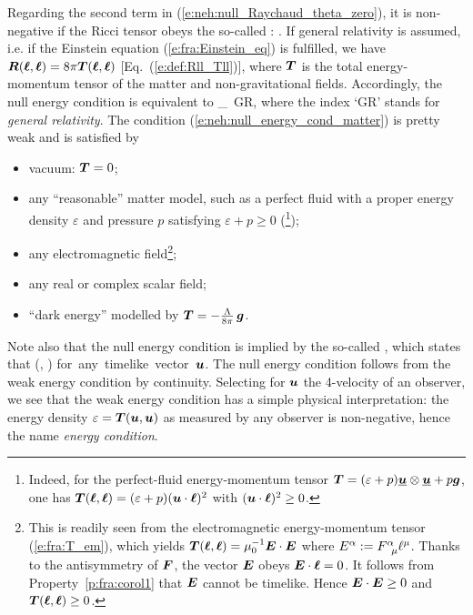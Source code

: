 Regarding the second term in (\ref{e:neh:null_Raychaud_theta_zero}),
it is non-negative if the Ricci tensor obeys the so-called
:
\be \label{e:neh:null_energy_cond}
    .
\ee
If general relativity is assumed, i.e. if the Einstein equation
(\ref{e:fra:Einstein_eq}) is fulfilled, we have
$\bm{R}(\bm{\ell}, \bm{\ell}) = 8\pi \bm{T}(\bm{\ell},\bm{\ell})$ [Eq.~(\ref{e:def:Rll_Tll})],
where $\bm{T}$ is the total energy-momentum tensor of the matter and
non-gravitational fields. Accordingly, the null energy condition
is equivalent to
\be \label{e:neh:null_energy_cond_matter}
    _{\rm\,  GR},
\ee
where the index `GR' stands for \emph{general relativity}.
The condition (\ref{e:neh:null_energy_cond_matter}) is pretty weak and is satisfied by
\begin{itemize}
\item vacuum: $\bm{T}=0$;
\item any ``reasonable'' matter model, such as a perfect fluid with a
proper energy density $\varepsilon$ and pressure $p$ satisfying
$\varepsilon+p\geq 0$ (\footnote{Indeed, for the perfect-fluid
energy-momentum tensor $\bm{T} = (\varepsilon+p)\underline{\bm{u}}\otimes\underline{\bm{u}} + p \bm{g}$,
one has
$\bm{T}(\bm{\ell},\bm{\ell}) = (\varepsilon+p)(\bm{u}\cdot\bm{\ell})^2$ with $(\bm{u}\cdot\bm{\ell})^2\geq 0$.});
\item any electromagnetic field\footnote{This is readily seen from the electromagnetic
energy-momentum tensor (\ref{e:fra:T_em}), which yields $\bm{T}(\bm{\ell},\bm{\ell}) = \mu_0^{-1} \bm{E}\cdot\bm{E}$ where $E^\alpha := F^\alpha_{\ \, \mu} \ell^\mu$. Thanks to the antisymmetry
of $\bm{F}$, the vector $\bm{E}$ obeys $\bm{E}\cdot\bm{\ell} = 0$. It follows from
Property~\ref{p:fra:corol1} that $\bm{E}$ cannot be timelike. Hence
$\bm{E}\cdot\bm{E}\geq 0$ and $\bm{T}(\bm{\ell},\bm{\ell})\geq 0$.};
\item any real or complex scalar field;
\item ``dark energy'' modelled by $\bm{T} = -\frac{\Lambda}{8\pi}\, \bm{g}$.
\end{itemize}
Note also that the null energy condition is implied by the
so-called ,
which states that
\be
    (, )  \quad \mbox{for any timelike vector $\w{u}$}.
\ee
The null energy condition follows from the
weak energy condition by continuity.
Selecting for $\bm{u}$ the 4-velocity of an observer, we see that
the weak energy condition has a simple physical interpretation: the energy
density $\varepsilon=\bm{T}(\bm{u}, \bm{u})$ as measured by any observer is non-negative,
hence the name \emph{energy condition}.

